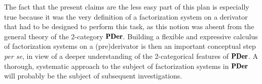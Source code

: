 The fact that the present claims are the less easy part of this plan is especially true because  it was the very definition of a factorization system on a derivator that had to be designed to perform this task, as this notion was absent from the general theory of the 2\hyp{}category $\PDer$. Building a flexible and expressive calculus of factorization systems on a (pre)derivator is then an important conceptual step \emph{per se}, in view of a deeper understanding of the 2\hyp{}categorical features of $\PDer$. A thorough, systematic approach to the subject of factorization systems in $\PDer$ will probably be the subject of subsequent investigations.
%
%
%
%
